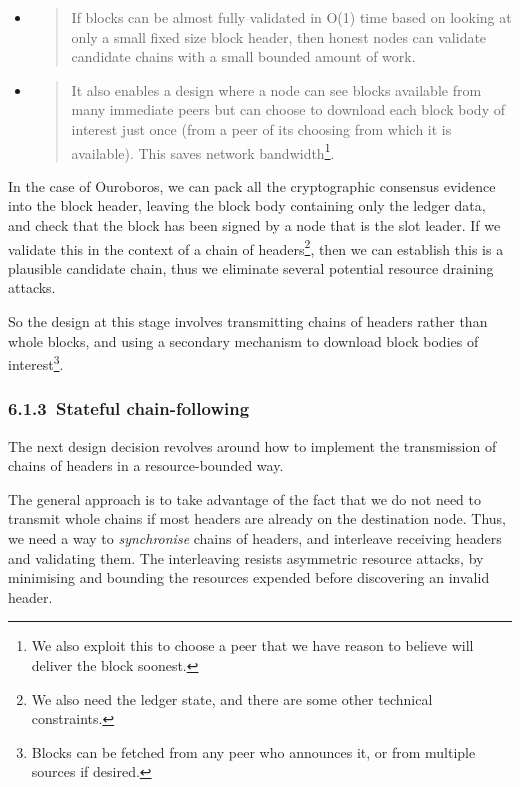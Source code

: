 \documentclass[11pt,a4paper]{article}
\begin{document}
\begin{itemize}
\item
  \begin{quote}
  If blocks can be almost fully validated in O(1) time based on looking
  at only a small fixed size block header, then honest nodes can
  validate candidate chains with a small bounded amount of work.
  \end{quote}
\item
  \begin{quote}
  It also enables a design where a node can see blocks available from
  many immediate peers but can choose to download each block body of
  interest just once (from a peer of its choosing from which it is
  available). This saves network bandwidth\footnote{We also exploit this
    to choose a peer that we have reason to believe will deliver the
    block soonest.}.
  \end{quote}
\end{itemize}

In the case of Ouroboros, we can pack all the cryptographic consensus
evidence into the block header, leaving the block body containing only
the ledger data, and check that the block has been signed by a node that
is the slot leader. If we validate this in the context of a chain of
headers\footnote{We also need the ledger state, and there are some other
  technical constraints.}, then we can establish this is a plausible
candidate chain, thus we eliminate several potential resource draining
attacks.

So the design at this stage involves transmitting chains of headers
rather than whole blocks, and using a secondary mechanism to download
block bodies of interest\footnote{Blocks can be fetched from any peer
  who announces it, or from multiple sources if desired.}.

\hypertarget{stateful-chain-following}{%
\subsubsection{​6.1.3​~Stateful
chain-following}\label{stateful-chain-following}}

The next design decision revolves around how to implement the
transmission of chains of headers in a resource-bounded way.

The general approach is to take advantage of the fact that we do not
need to transmit whole chains if most headers are already on the
destination node. Thus, we need a way to \emph{synchronise} chains of
headers, and interleave receiving headers and validating them. The
interleaving resists asymmetric resource attacks, by minimising and
bounding the resources expended before discovering an invalid header.
\end{document}
